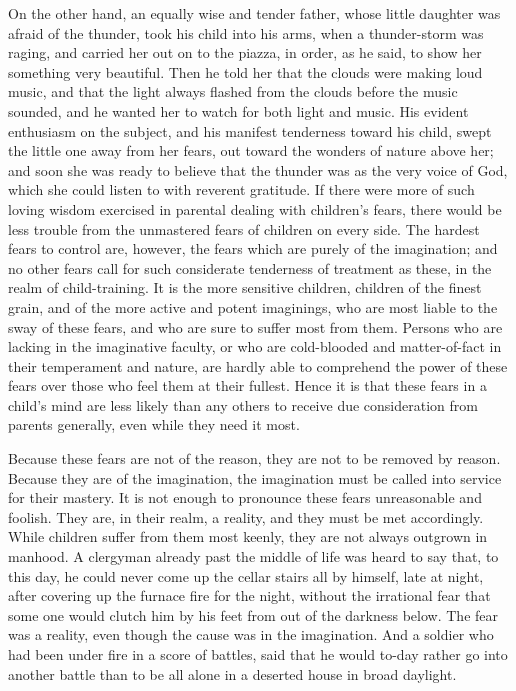 \documentclass[
]{book}
\begin{document}
On the other hand, an equally wise and tender father, whose little daughter was afraid of the thunder, took his child into his arms, when a thunder-storm was raging, and carried her out on to the piazza, in order, as he said, to show her something very beautiful. Then he told her that the clouds were making loud music, and that the light always flashed from the clouds before the music sounded, and he wanted her to watch for both light and music. His evident enthusiasm on the subject, and his manifest tenderness toward his child, swept the little one away from her fears, out toward the wonders of nature above her; and soon she was ready to believe that the thunder was as the very voice of God, which she could listen to with reverent gratitude. If there were more of such loving wisdom exercised in parental dealing with children's fears, there would be less trouble from the unmastered fears of children on every side. The hardest fears to control are, however, the fears which are purely of the imagination; and no other fears call for such considerate tenderness of treatment as these, in the realm of child-training. It is the more sensitive children, children of the finest grain, and of the more active and potent imaginings, who are most liable to the sway of these fears, and who are sure to suffer most from them. Persons who are lacking in the imaginative faculty, or who are cold-blooded and matter-of-fact in their temperament and nature, are hardly able to comprehend the power of these fears over those who feel them at their fullest. Hence it is that these fears in a child's mind are less likely than any others to receive due consideration from parents generally, even while they need it most.

Because these fears are not of the reason, they are not to be removed by reason. Because they are of the imagination, the imagination must be called into service for their mastery. It is not enough to pronounce these fears unreasonable and foolish. They are, in their realm, a reality, and they must be met accordingly. While children suffer from them most keenly, they are not always outgrown in manhood. A clergyman already past the middle of life was heard to say that, to this day, he could never come up the cellar stairs all by himself, late at night, after covering up the furnace fire for the night, without the irrational fear that some one would clutch him by his feet from out of the darkness below. The fear was a reality, even though the cause was in the imagination. And a soldier who had been under fire in a score of battles, said that he would to-day rather go into another battle than to be all alone in a deserted house in broad daylight.
\end{document}
